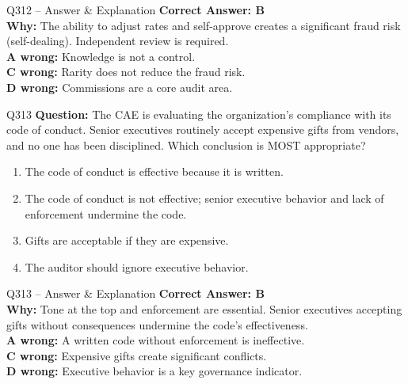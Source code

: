 \documentclass[aspectratio=169,10pt]{beamer}
\begin{document}
	\begin{frame}[t]{Q312 -- Answer \& Explanation}
		\small
		\textbf{Correct Answer: B} \\[4pt]
		\textbf{Why:} The ability to adjust rates and self-approve creates a significant fraud risk (self-dealing). Independent review is required. \\[4pt]
		\textbf{A wrong:} Knowledge is not a control. \\[2pt]
		\textbf{C wrong:} Rarity does not reduce the fraud risk. \\[2pt]
		\textbf{D wrong:} Commissions are a core audit area.
	\end{frame}
	
	\begin{frame}[t]{Q313}
		\small
		\textbf{Question:} The CAE is evaluating the organization's compliance with its code of conduct. Senior executives routinely accept expensive gifts from vendors, and no one has been disciplined. Which conclusion is MOST appropriate?
		\begin{enumerate}[label=\Alph*.,itemsep=1pt,topsep=2pt]
			\item The code of conduct is effective because it is written.
			\item The code of conduct is not effective; senior executive behavior and lack of enforcement undermine the code.
			\item Gifts are acceptable if they are expensive.
			\item The auditor should ignore executive behavior.
		\end{enumerate}
	\end{frame}
	
	\begin{frame}[t]{Q313 -- Answer \& Explanation}
		\small
		\textbf{Correct Answer: B} \\[4pt]
		\textbf{Why:} Tone at the top and enforcement are essential. Senior executives accepting gifts without consequences undermine the code's effectiveness. \\[4pt]
		\textbf{A wrong:} A written code without enforcement is ineffective. \\[2pt]
		\textbf{C wrong:} Expensive gifts create significant conflicts. \\[2pt]
		\textbf{D wrong:} Executive behavior is a key governance indicator.
	\end{frame}
	
\end{document}
